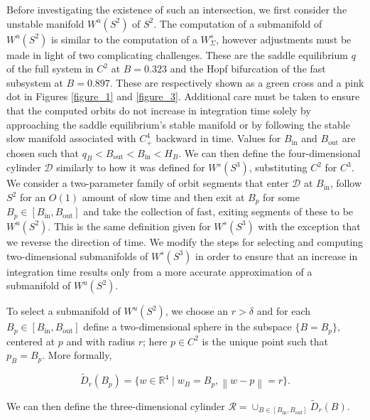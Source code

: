 \documentclass{ws-ijbc}
\begin{document}
Before investigating the existence of such an intersection, we first consider the unstable manifold $W^{u}(S^2)$ of $S^2$.  The computation of a submanifold of $W^{u}(S^2)$ is similar to the computation of a $W^{s}_\Sigma$, however adjustments must be made in light of two complicating challenges.  These are the saddle equilibrium $q$ of the full system in $C^2$ at $B = 0.323$ and the Hopf bifurcation of the fast subsystem at $B = 0.897$.  These are respectively shown as a green cross and a pink dot in Figures \ref{figure_1} and \ref{figure_3}.  Additional care must be taken to ensure that the computed orbits do not increase in integration time solely by approaching the saddle equilibrium's stable manifold or by following the stable slow manifold associated with $C^4_+$ backward in time.  Values for $B_{\mathrm{in}}$ and $B_{\mathrm{out}}$ are chosen such that $q_B < B_{\mathrm{out}} < B_{\mathrm{in}}< H_B$.  We can then define the four-dimensional cylinder $\mathscr{D}$ similarly to how it was defined for $W^s(S^3)$, substituting $C^2$ for $C^3$.  We consider a two-parameter family of orbit segments that enter $\mathscr{D}$ at $B_{\mathrm{in}}$, follow $S^2$ for an $O(1)$ amount of slow time and then exit at $B_p$ for some $B_p \in [B_{\mathrm{in}}, B_{\mathrm{out}}]$ and take the collection of fast, exiting segments of these to be $W^u(S^2)$.  This is the same definition given for $W^s(S^3)$ with the exception that we reverse the direction of time.  We modify the steps for selecting and computing two-dimensional submanifolds of $W^s(S^3)$ in order to ensure that an increase in integration time results only from a more accurate approximation of a submanifold of $W^u(S^2)$.

To select a submanifold of $W^u(S^2)$, we choose an $r>\delta$ and for each $B_p \in [B_{\mathrm{in}}, B_{\mathrm{out}}]$ define a two-dimensional sphere in the subspace $\{B=B_p\}$, centered at $p$ and with radius $r$; here $p \in C^2$ is the unique point such that $p_B = B_p$.  More formally,

\begin{equation*}
\widetilde{D}_r(B_p)=\{w \in \mathbb{R}^4 \;|\; w_B = B_p, \left\lVert w-p \right\lVert  = r\}.
\end{equation*}

\noindent
We can then define the three-dimensional cylinder $\mathscr{R} = \cup_{B \in [B_{\mathrm{in}}, B_{\mathrm{out}}]}\widetilde{D}_r(B)$.  
\end{document}

